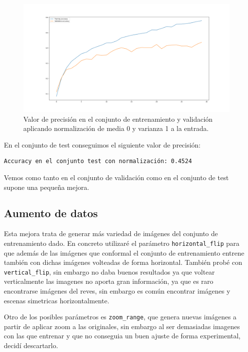 \documentclass[12pt, spanish]{article}
\begin{document}
\begin{figure}[H]
  \centering
      \includegraphics[width=\textwidth]{1-2-norm-2.png}
 		\caption{Valor de precisión en el conjunto de entrenamiento y validación aplicando normalización de media 0 y varianza 1 a la entrada.}
\end{figure}



En el conjunto de test conseguimos el siguiente valor de precisión:

\begin{lstlisting}
Accuracy en el conjunto test con normalización: 0.4524
\end{lstlisting}

Vemos como tanto en el conjunto de validación como en el conjunto de test supone una pequeña mejora.


\subsection{Aumento de datos}

Esta mejora trata de generar más variedad de imágenes del conjunto de entrenamiento dado. En concreto utilizaré el parámetro \texttt{horizontal\_flip} para que además de las imágenes que conformal el conjunto de entrenamiento entrene también con dichas imágenes volteadas de forma horizontal. También probé con \texttt{vertical\_flip}, sin embargo no daba buenos resultados ya que voltear verticalmente las imagenes no aporta gran información, ya que es raro encontrarse imágenes del reves, sin embargo es común encontrar imágenes y escenas simetricas horizontalmente.

Otro de los posibles parámetros es \texttt{zoom\_range}, que genera nuevas imágenes a partir de aplicar zoom a las originales, sin embargo al ser demasiadas imagenes con las que entrenar y que no conseguia un buen ajuste de forma experimental, decidí descartarlo.
\end{document}
